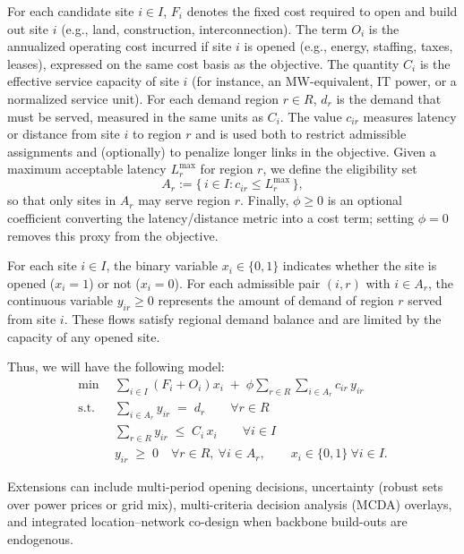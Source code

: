 \documentclass[pdflatex,sn-mathphys-num]{sn-jnl}
\theoremstyle{thmstyleone}
\theoremstyle{thmstyletwo}
\theoremstyle{thmstylethree}
\begin{document}
For each candidate site $i \in I$, $F_i$ denotes the fixed cost required to open and build out site $i$ (e.g., land, construction, interconnection). The term $O_i$ is the annualized operating cost incurred if site $i$ is opened (e.g., energy, staffing, taxes, leases), expressed on the same cost basis as the objective. The quantity $C_i$ is the effective service capacity of site $i$ (for instance, an MW-equivalent, IT power, or a normalized service unit). For each demand region $r \in R$, $d_r$ is the demand that must be served, measured in the same units as $C_i$. The value $c_{ir}$ measures latency or distance from site $i$ to region $r$ and is used both to restrict admissible assignments and (optionally) to penalize longer links in the objective. Given a maximum acceptable latency $L_r^{\max}$ for region $r$, we define the eligibility set
\[
A_r := \{\, i \in I : c_{ir} \le L_r^{\max} \,\},
\]
so that only sites in $A_r$ may serve region $r$. Finally, $\phi \ge 0$ is an optional coefficient converting the latency/distance metric into a cost term; setting $\phi=0$ removes this proxy from the objective.

For each site $i \in I$, the binary variable $x_i \in \{0,1\}$ indicates whether the site is opened ($x_i=1$) or not ($x_i=0$). For each admissible pair $(i,r)$ with $i \in A_r$, the continuous variable $y_{ir} \ge 0$ represents the amount of demand of region $r$ served from site $i$. These flows satisfy regional demand balance and are limited by the capacity of any opened site.

Thus, we will have the following model:
\begin{align}
\min \ \ & \sum_{i \in I} (F_i + O_i) x_i \;+\; \phi \sum_{r \in R}\sum_{i \in A_r} c_{ir}\, y_{ir} \label{eq:base-obj}\\
\text{s.t. } 
& \sum_{i \in A_r} y_{ir} \;=\; d_r \qquad \forall r \in R \label{eq:base-demand}\\
& \sum_{r \in R} y_{ir} \;\le\; C_i\, x_i \qquad \forall i \in I \label{eq:base-capacity}\\
& y_{ir} \;\ge\; 0 \quad \forall r \in R, \ \forall i \in A_r, \qquad x_i \in \{0,1\} \ \forall i \in I. \label{eq:base-bounds}
\end{align}

Extensions can include multi-period opening decisions, uncertainty (robust sets over power prices or grid mix), multi-criteria decision analysis (MCDA) overlays, and integrated location–network co-design when backbone build-outs are endogenous.
\end{document}
